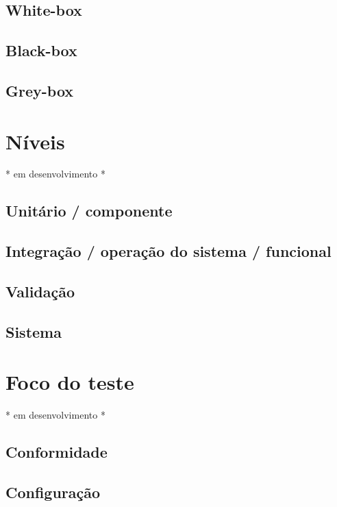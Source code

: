 \documentclass[
	12pt,				%
	openright,			%
	oneside,			%
	a4paper,			%
	english,			%
	brazil,				%
	]{abntex2}
\begin{document}
\subsection{White-box}

\subsection{Black-box}

\subsection{Grey-box}

\section{Níveis}
* em desenvolvimento *

\subsection{Unitário / componente}

\subsection{Integração / operação do sistema / funcional}

\subsection{Validação}

\subsection{Sistema}

\section{Foco do teste}
* em desenvolvimento *

\subsection{Conformidade}

\subsection{Configuração}
\end{document}
